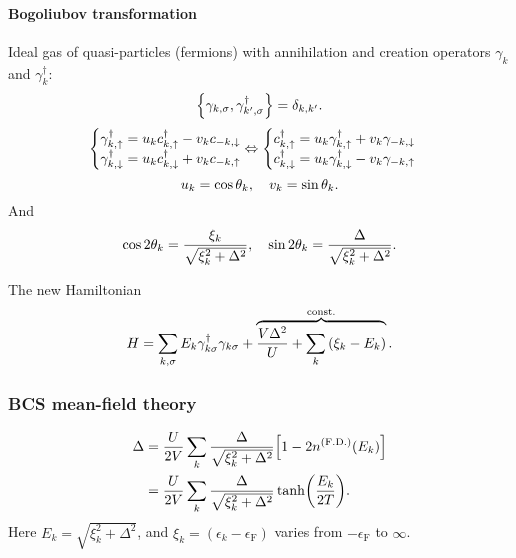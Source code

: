 \documentclass[11pt,letter, swedish, english, twocolumn
]{article}
\newcommand{\eF}{\ensuremath{{\epsilon_{\text{F}}}}}
\begin{document}
\paragraph{Bogoliubov transformation}
Ideal gas of quasi-particles (fermions) with annihilation and creation
operators $\gamma_k$ and $\gamma_k^\dagger$:
\begin{equation}
\acomm{\gamma_{k,\sigma}}{\gamma_{k',\sigma}^\dagger}=\delta_{k,k'}.
\end{equation}
\begin{equation}
\begin{cases}
\gamma_{k,\uparrow}^\dagger=u_kc_{k,\uparrow}^\dagger-v_kc_{-k,\downarrow}\\
\gamma_{k,\downarrow}^\dagger=u_kc_{k,\downarrow}^\dagger+v_kc_{-k,\uparrow}\\
\end{cases}
\hspace{-11pt}\Leftrightarrow
\begin{cases}
c_{k,\uparrow}^\dagger=u_k\gamma_{k,\uparrow}^\dagger+v_k\gamma_{-k,\downarrow}\\
c_{k,\downarrow}^\dagger=u_k\gamma_{k,\downarrow}^\dagger-v_k\gamma_{-k,\uparrow}\\
\end{cases}
\end{equation}
\begin{equation}
u_k=\cos\theta_k\qcomma
v_k=\sin\theta_k.
\end{equation}
And
\begin{equation}
\cos2\theta_k=\frac{\xi_k}{\sqrt{\xi_k^2+\Delta^2}}\qcomma
\sin2\theta_k=\frac{\Delta}{\sqrt{\xi_k^2+\Delta^2}}.
\end{equation}


The new Hamiltonian
\begin{equation}
H=\sum_{k, \sigma} E_k\gamma_{k \sigma}^\dagger\gamma_{k \sigma}
+\overbrace{\frac{V\Delta^2}{U}+\sum_k\qty(\xi_k-E_k)}^{\text{const.}}.
\end{equation}



\subsubsection{BCS mean-field theory}
\begin{equation}
\begin{aligned}
\Delta &= \frac{U}{2V}\sum_k \frac{\Delta}{\sqrt{\xi_k^2+\Delta^2}}
\qty[1-2n^{(\text{F.D.})}(E_k)]\\
&= \frac{U}{2V}\sum_k \frac{\Delta}{\sqrt{\xi_k^2+\Delta^2}}
\tanh(\frac{E_k}{2T}).
\end{aligned}
\end{equation}
Here $E_k=\sqrt{\xi_k^2+\Delta^2}$, and $\xi_k=(\epsilon_k-\eF)$ varies
from $-\eF$ to $\infty$.
\end{document}
